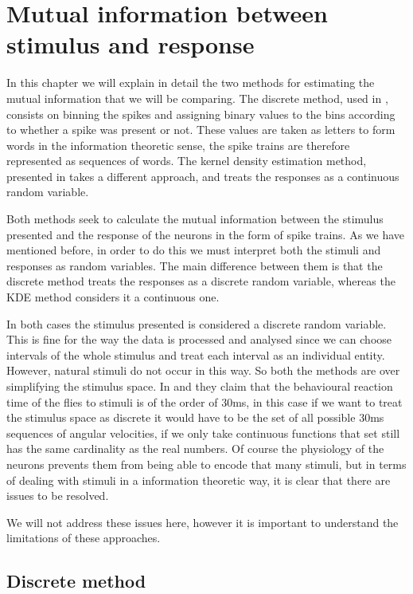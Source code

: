 \documentclass[10pt,a4paper]{book}
\begin{document}
\chapter{Mutual information between stimulus and response}

In this chapter we will explain in detail the two methods for estimating the mutual information that we will be comparing. The discrete method, used in \cite{deRuyter97}, consists on binning the spikes and assigning binary values to the bins according to whether a spike was present or not. These values are taken as letters to form words in the information theoretic sense, the spike trains are therefore represented as sequences of words. The kernel density estimation method, presented in \cite{houghton13} takes a different approach, and treats the responses as a continuous random variable.

Both methods seek to calculate the mutual information between the stimulus presented and the response of the neurons in the form of spike trains. As we have mentioned before, in order to do this we must interpret both the stimuli and responses as random variables. The main difference between them is that the discrete method treats the responses as a discrete random variable, whereas the KDE method considers it a continuous one.

In both cases the stimulus presented is considered a discrete random variable. This is fine for the way the data is processed and analysed since we can choose intervals of the whole stimulus and treat each interval as an individual entity. However, natural stimuli do not occur in this way. So both the methods are over simplifying the stimulus space. In \cite{bialek91} and \cite{deRuyter97} they claim that the behavioural reaction time of the flies to stimuli is of the order of $30$ms, in this case if we want to treat the stimulus space as discrete it would have to be the set of all possible $30$ms sequences of angular velocities, if we only take continuous functions that set still has the same cardinality as the real numbers. Of course the physiology of the neurons prevents them from being able to encode that many stimuli, but in terms of dealing with stimuli in a information theoretic way, it is clear that there are issues to be resolved.

We will not address these issues here, however it is important to understand the limitations of these approaches.

\section{Discrete method}
\end{document}
